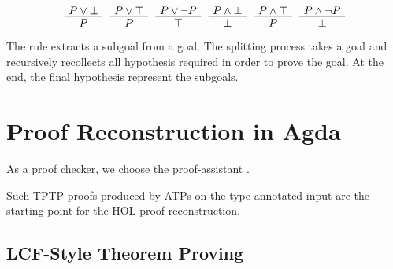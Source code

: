 \documentclass[runningheads,a4paper]{llncs}
\newenvironment{bprooftree}
  {\leavevmode\hbox\bgroup}
  {\DisplayProof\egroup}
\begin{document}
\[
\begin{bprooftree}
  \AxiomC{$P \vee \bot$}
  \UnaryInfC{$P$}
\end{bprooftree}
\begin{bprooftree}
  \AxiomC{$P \vee \top$}
  \UnaryInfC{$P$}
\end{bprooftree}
\begin{bprooftree}
  \AxiomC{$P \vee \neg P$}
  \UnaryInfC{$\top$}
\end{bprooftree}
\begin{bprooftree}
  \AxiomC{$P \wedge \bot$}
  \UnaryInfC{$\bot$}
\end{bprooftree}
\begin{bprooftree}
  \AxiomC{$P \wedge \top$}
  \UnaryInfC{$P$}
\end{bprooftree}
\begin{bprooftree}
  \AxiomC{$P \wedge \neg P$}
  \UnaryInfC{$\bot$}
\end{bprooftree}
\]

The  rule extracts a subgoal from a goal. The splitting process
takes a goal and recursively recollects all hypothesis required in order to prove the goal.
At the end, the final hypothesis represent the subgoals.

\section{Proof Reconstruction in Agda}
\label{secproofrecon}
As a proof checker, we choose the proof-assistant .

Such TPTP proofs produced by ATPs on the type-annotated input are the
starting point for the HOL proof reconstruction.

\subsection{LCF-Style Theorem Proving}
\end{document}
